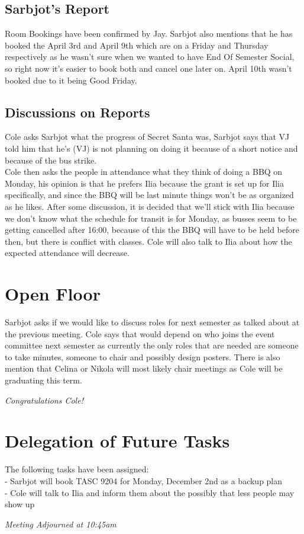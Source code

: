 \documentclass[12pt]{article}
\begin{document}
\subsection{Sarbjot's Report}
Room Bookings have been confirmed by Jay. Sarbjot also mentions that he has booked the April 3rd and April 9th which are on a Friday and Thursday respectively as he wasn't sure when we wanted to have End Of Semester Social, so right now it's easier to book both and cancel one later on. April 10th wasn't booked due to it being Good Friday.

\subsection{Discussions on Reports}
\noindent Cole asks Sarbjot what the progress of Secret Santa was, Sarbjot says that VJ told him that he's (VJ) is not planning on doing it because of a short notice and because of the bus strike. \\

\noindent Cole then asks the people in attendance what they think of doing a BBQ on Monday, his opinion is that he prefers Ilia because the grant is set up for Ilia specifically, and since the BBQ will be last minute things won't be as organized as he likes. After some discussion, it is decided that we'll stick with Ilia because we don't know what the schedule for transit is for Monday, as busses seem to be getting cancelled after 16:00, because of this the BBQ will have to be held before then, but there is conflict with classes. Cole will also talk to Ilia about how the expected attendance will decrease.  \\ 

\section{Open Floor} \label{sec: Open}
\noindent Sarbjot asks if we would like to discuss roles for next semester as talked about at the previous meeting. Cole says that would depend on who joins the event committee next semester as currently the only roles that are needed are someone to take minutes, someone to chair and possibly design posters.  There is also mention that Celina or Nikola will most likely chair meetings as Cole will be graduating this term.  
\begin{center}
\em Congratulations Cole!  
\end{center}

\section{Delegation of Future Tasks} \label{sec: Future}
\noindent The following tasks have been assigned: \\
- Sarbjot will book TASC 9204 for Monday, December 2nd as a backup plan\\
- Cole will talk to Ilia and inform them about the possibly that less people may show up  \\
\begin{center}
\em{Meeting Adjourned at 10:45am}
\end{center}
\end{document}
